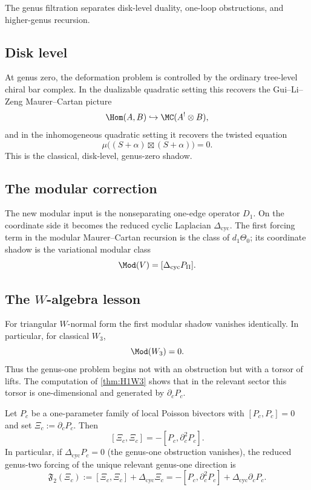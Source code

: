 The genus filtration separates disk-level duality, one-loop
obstructions, and higher-genus recursion.

\subsection{Disk level}

At genus zero, the deformation problem is controlled by the ordinary tree-level chiral bar
complex. In the dualizable quadratic setting this recovers the Gui--Li--Zeng Maurer--Cartan
picture
\[
\Hom(A,B)\hookrightarrow \MC(A^!\otimes B),
\]
and in the inhomogeneous quadratic setting it recovers the twisted equation
\[
\mu\big((S+\alpha)\boxtimes(S+\alpha)\big)=0.
\]
This is the classical, disk-level, genus-zero shadow.

\subsection{The modular correction}

The new modular input is the nonseparating one-edge operator $D_1$. On the coordinate side
it becomes the reduced cyclic Laplacian $\Delta_{\mathrm{cyc}}$. The first forcing term in the
modular Maurer--Cartan recursion is the class of $d_1\Theta_0$; its coordinate shadow is the
variational modular class
\[
\Mod(V)=[\Delta_{\mathrm{cyc}}P_\Pi].
\]

\subsection{The $W$-algebra lesson}

For triangular $W$-normal form the first modular shadow vanishes identically. In particular,
for classical $W_3$,
\[
\Mod(W_3)=0.
\]
Thus the genus-one problem begins not with an obstruction but with a torsor of lifts. The
computation of \cref{thm:H1W3} shows that in the relevant sector this torsor is one-dimensional
and generated by $\partial_cP_c$.

\begin{proposition}
\label{prop:quadratic-genus-two-line}
Let $P_c$ be a one-parameter family of local Poisson bivectors with
$[P_c,P_c]=0$ and set $\Xi_c:=\partial_cP_c$. Then
\[
[\Xi_c,\Xi_c]=-[P_c,\partial_c^2P_c].
\]
In particular, if $\Delta_{\mathrm{cyc}}P_c=0$ \textup{(}the genus-one
obstruction vanishes\textup{)}, the reduced genus-two forcing of the
unique relevant genus-one direction is
\[
\mathfrak{F}_2(\Xi_c)
:=
[\Xi_c,\Xi_c]+\Delta_{\mathrm{cyc}}\Xi_c
=
-[P_c,\partial_c^2P_c]+\Delta_{\mathrm{cyc}}\partial_cP_c.
\]
\end{proposition}

